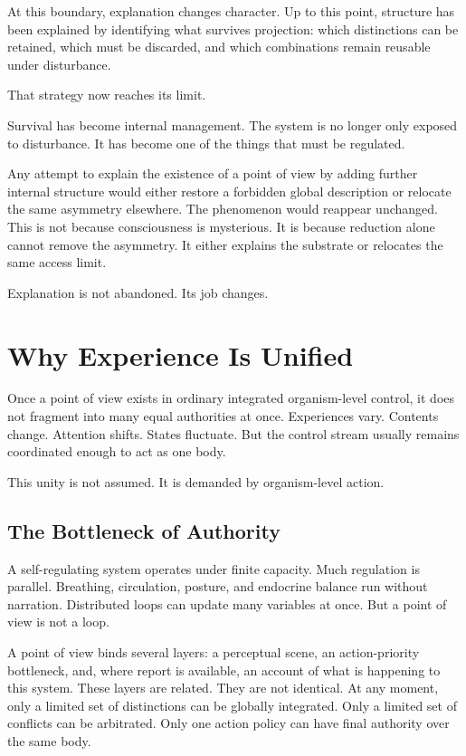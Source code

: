 \documentclass[11pt,twoside,openright]{book}
\begin{document}
At this boundary, explanation changes character. Up to this point, structure has been explained by identifying what survives projection: which distinctions can be retained, which must be discarded, and which combinations remain reusable under disturbance.

That strategy now reaches its limit.

Survival has become internal management.
The system is no longer only exposed to disturbance.
It has become one of the things that must be regulated.

Any attempt to explain the existence of a point of view by adding further internal structure would either restore a forbidden global description or relocate the same asymmetry elsewhere. The phenomenon would reappear unchanged. This is not because consciousness is mysterious. It is because reduction alone cannot remove the asymmetry. It either explains the substrate or relocates the same access limit.

Explanation is not abandoned.
Its job changes.
\chapter{Why Experience Is Unified}
\label{ch:unity_of_experience}

Once a point of view exists in ordinary integrated organism-level control, it does not fragment into many equal authorities at once. Experiences vary. Contents change. Attention shifts. States fluctuate. But the control stream usually remains coordinated enough to act as one body.

This unity is not assumed. It is demanded by organism-level action.

\section*{The Bottleneck of Authority}

A self-regulating system operates under finite capacity. Much regulation is parallel. Breathing, circulation, posture, and endocrine balance run without narration. Distributed loops can update many variables at once. But a point of view is not a loop.

A point of view binds several layers: a perceptual scene, an action-priority bottleneck, and, where report is available, an account of what is happening to this system. These layers are related. They are not identical. At any moment, only a limited set of distinctions can be globally integrated. Only a limited set of conflicts can be arbitrated. Only one action policy can have final authority over the same body.
\end{document}

